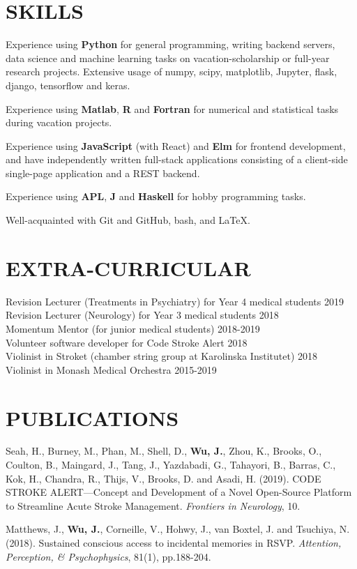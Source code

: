 \documentclass[margin]{res}
\begin{document}
\begin{resume}
\section{SKILLS}

Experience using {\bf Python} for general programming, writing backend servers, data science and machine learning tasks on vacation-scholarship or full-year research projects. Extensive usage of numpy, scipy, matplotlib, Jupyter, flask, django, tensorflow and keras.

Experience using {\bf Matlab}, {\bf R} and {\bf Fortran} for numerical and statistical tasks during vacation projects.

Experience using {\bf JavaScript} (with React) and {\bf Elm} for frontend development, and have independently written full-stack applications consisting of a client-side single-page application and a REST backend.

Experience using {\bf APL}, {\bf J} and {\bf Haskell} for hobby programming tasks.

Well-acquainted with Git and GitHub, bash, and LaTeX.

\clearpage

\section{EXTRA-CURRICULAR}

Revision Lecturer (Treatments in Psychiatry) for Year 4 medical students \hfill 2019 \\
Revision Lecturer (Neurology) for Year 3 medical students \hfill 2018 \\
Momentum Mentor (for junior medical students) \hfill 2018-2019 \\
Volunteer software developer for Code Stroke Alert \hfill 2018 \\
Violinist in Stroket (chamber string group at Karolinska Institutet) \hfill 2018 \\
Violinist in Monash Medical Orchestra \hfill 2015-2019 \\

\section{PUBLICATIONS}

Seah, H., Burney, M., Phan, M., Shell, D., {\bf Wu, J.}, Zhou, K., Brooks, O., Coulton, B., Maingard, J., Tang, J., Yazdabadi, G., Tahayori, B., Barras, C., Kok, H., Chandra, R., Thijs, V., Brooks, D. and Asadi, H. (2019). CODE STROKE ALERT—Concept and Development of a Novel Open-Source Platform to Streamline Acute Stroke Management. {\it Frontiers in Neurology}, 10.

Matthews, J., {\bf Wu, J.}, Corneille, V., Hohwy, J., van Boxtel, J. and Tsuchiya, N. (2018). Sustained conscious access to incidental memories in RSVP. {\it Attention, Perception, & Psychophysics}, 81(1), pp.188-204. \\

\end{resume}
\end{document}
